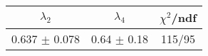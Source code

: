 \begin{tabular}{c|c||c}
$\lambda_{2}$ & $\lambda_4$ & $\chi^{2}$/ndf \\
\hline
0.637 $\pm$ 0.078 & 0.64 $\pm$ 0.18 & 115/95\\
\end{tabular}
